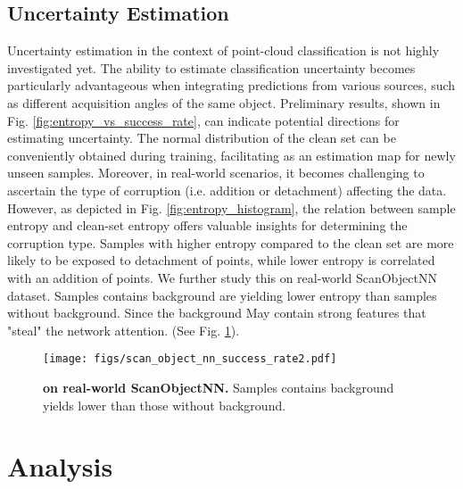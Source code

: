 \documentclass[10pt,twocolumn,letterpaper]{article}
\begin{document}
\subsection{Uncertainty Estimation}
Uncertainty estimation in the context of point-cloud classification is not highly investigated yet. The ability to estimate classification uncertainty becomes particularly advantageous when integrating predictions from various sources, such as different acquisition angles of the same object. Preliminary results, shown in Fig. \ref{fig:entropy_vs_success_rate}, can indicate potential directions for estimating uncertainty. The normal distribution of the clean set can be conveniently obtained during training, facilitating as an estimation map for newly unseen samples. Moreover, in real-world scenarios, it becomes challenging to ascertain the type of corruption (i.e. addition or detachment) affecting the data. However, as depicted in Fig. \ref{fig:entropy_histogram}, the relation between sample entropy and clean-set entropy offers valuable insights for determining the corruption type. Samples with higher entropy compared to the clean set are more likely to be exposed to detachment of points, while lower entropy is correlated with an addition of points.
We further study this on real-world ScanObjectNN\cite{scanobjectnn} dataset. Samples contains background are yielding lower entropy than samples without background. Since the background May contain strong features that "steal" the network attention. (See Fig. \ref{fig:scan_object_nn_success_rate}).
\begin{figure}[ptbh!]
  \centering
\texttt{[image: figs/scan\_object\_nn\_success\_rate2.pdf]}
   \caption{{\bf  on real-world ScanObjectNN\cite{scanobjectnn}.} Samples contains background yields lower  than those without background.}
   \label{fig:scan_object_nn_success_rate}
\end{figure}

\section{Analysis}
\end{document}
